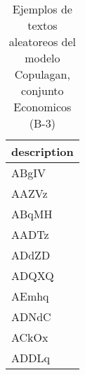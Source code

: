 \begin{table}[H]
\centering
\fontsize{8}{14}\selectfont
\caption{Ejemplos de textos aleatoreos del modelo Copulagan, conjunto Economicos (B-3)}
\label{table-sample10-economicos-b-3-copulagan-text}
\begin{tabular}{|m{50em}|}
\hline
\rowcolor[gray]{0.8}
description \\
\hline ABgIV \\
\hline AAZVz \\
\hline ABqMH \\
\hline AADTz \\
\hline ADdZD \\
\hline ADQXQ \\
\hline AEmhq \\
\hline ADNdC \\
\hline ACkOx \\
\hline ADDLq \\
\hline
\end{tabular}
\end{table}
